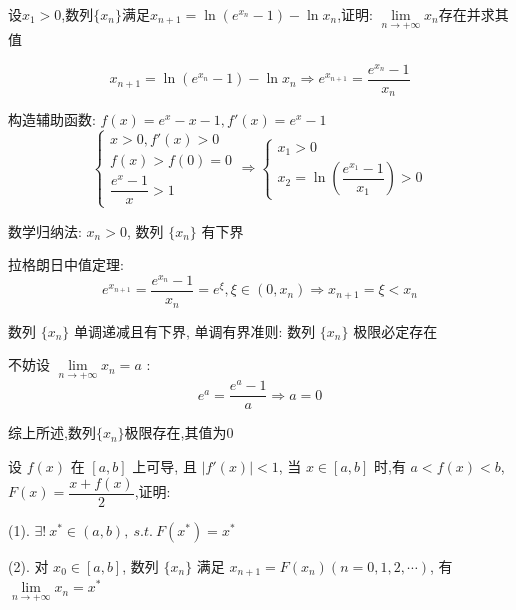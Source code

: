 \begin{proposition}
	设$x_{1}>0$,数列$\{x_{n}\}$满足$x_{n+1}=\ln(e^{x_{n}}-1)-\ln x_{n}$,证明:  $\lim\limits_{n\rightarrow +\infty}x_{n}$存在并求其值
\end{proposition}
\begin{solution}
	
	$$x_{n+1}=\ln(e^{x_{n}}-1)-\ln x_{n} \Rightarrow e^{x_{n+1}}=\dfrac{e^{x_{n}}-1}{x_{n}}$$
	
	构造辅助函数: $f(x)=e^x-x-1, f'(x)=e^{x}-1$
	$$\begin{cases}
		x > 0, f'(x) > 0\\
		f(x) > f(0) = 0\\
		\dfrac{e^{x}-1}{x} > 1
	\end{cases}\Rightarrow 
	\begin{cases}
		x_{1} > 0\\
		x_{2} = \ln(\dfrac{e^{x_{1}}-1}{x_{1}}) > 0
	\end{cases}
	$$
	
	数学归纳法: $x_{n}>0$, 数列 $\{ x_{n}\}$ 有下界
	
	拉格朗日中值定理:  
	$$e^{x_{n+1}}=\dfrac{e^{x_{n}}-1}{x_{n}}=e^{\xi}, \xi\in(0,x_{n})\Rightarrow x_{n+1} = \xi < x_{n}$$
	
	数列 $\{x_{n}\}$ 单调递减且有下界, 单调有界准则: 数列 $\{x_{n}\}$ 极限必定存在
	
	不妨设 $\lim\limits_{n\rightarrow +\infty}x_{n}=a$ :  
	$$e^{a}=\dfrac{e^a-1}{a}\Rightarrow a=0$$
	
	综上所述,数列$\{x_{n}\}$极限存在,其值为$0$
\end{solution}
\begin{proposition}
	设 $f(x)$ 在 $[a,b]$ 上可导, 且 $|f'(x)|<1$, 当 $x\in[a,b]$ 时,有 $a<f(x)<b$,$F(x)=\dfrac{x+f(x)}{2}$,证明:  

(1). $\exists!\ x^{*}\in(a,b),\ s.t.\ F(x^{*})=x^{*}$

(2). 对 $x_{0}\in[a,b]$, 数列 $\{x_{n}\}$ 满足 $x_{n+1}=F(x_{n})(n=0,1,2,\cdots)$, 有 $\lim\limits_{n\rightarrow+\infty}x_{n}=x^{*}$

\end{proposition}
